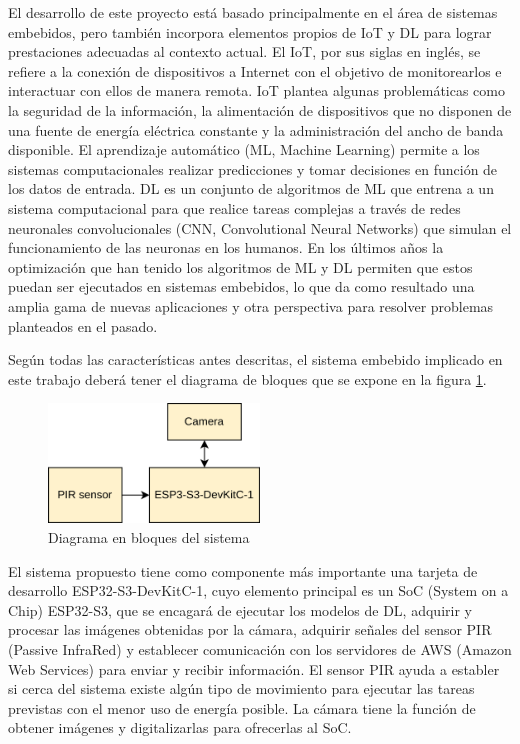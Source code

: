 \documentclass[
11pt, %
]{plan}
\begin{document}
El desarrollo de este proyecto está basado principalmente en el área de sistemas embebidos, pero también incorpora elementos propios de IoT y DL para lograr prestaciones adecuadas al contexto actual. El IoT, por sus siglas en inglés, se refiere a la conexión de dispositivos a Internet con el objetivo de monitorearlos e interactuar con ellos de manera remota. IoT plantea algunas problemáticas como la seguridad de la información, la alimentación de dispositivos que no disponen de una fuente de energía eléctrica constante y la administración del ancho de banda disponible. El aprendizaje automático (ML, Machine Learning) permite a los sistemas computacionales realizar predicciones y tomar decisiones en función de los datos de entrada. DL es un conjunto de algoritmos de ML que entrena a un sistema computacional para que realice tareas complejas a través de redes neuronales convolucionales (CNN, Convolutional Neural Networks) que simulan el funcionamiento de las neuronas en los humanos. En los últimos años la optimización que han tenido los algoritmos de ML y DL permiten que estos puedan ser ejecutados en sistemas embebidos, lo que da como resultado una amplia gama de nuevas aplicaciones y otra perspectiva para resolver problemas planteados en el pasado.

Según todas las características antes descritas, el sistema embebido implicado en este trabajo deberá tener el diagrama de bloques que se expone en la figura \ref{fig:blocks}.

\begin{figure}[htpb]
\centering
\includegraphics[width=0.5\textwidth]{./fig/blocks.png}
\caption{Diagrama en bloques del sistema}
\label{fig:blocks}
\end{figure}

\vspace{25px}

El sistema propuesto tiene como componente más importante una tarjeta de desarrollo ESP32-S3-DevKitC-1, cuyo elemento principal es un SoC (System on a Chip) ESP32-S3, que se encagará de ejecutar los modelos de DL, adquirir y procesar las imágenes obtenidas por la cámara, adquirir señales del sensor PIR (Passive InfraRed) y establecer comunicación con los servidores de AWS (Amazon Web Services) para enviar y recibir información. El sensor PIR ayuda a establer si cerca del sistema existe algún tipo de movimiento para ejecutar las tareas previstas con el menor uso de energía posible. La cámara tiene la función de obtener imágenes y digitalizarlas para ofrecerlas al SoC.
\end{document}
